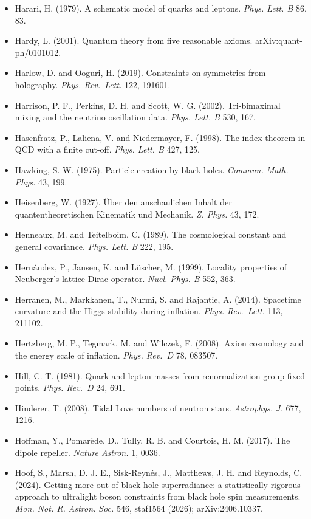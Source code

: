 \documentclass[
  11pt,
]{article}
\begin{document}
\begin{itemize}
\item
  Harari, H. (1979). A schematic model of quarks and leptons. \emph{Phys. Lett. B} 86, 83.
\item
  Hardy, L. (2001). Quantum theory from five reasonable axioms. arXiv:quant-ph/0101012.
\item
  Harlow, D. and Ooguri, H. (2019). Constraints on symmetries from holography. \emph{Phys. Rev.~Lett.} 122, 191601.
\item
  Harrison, P. F., Perkins, D. H. and Scott, W. G. (2002). Tri-bimaximal mixing and the neutrino oscillation data. \emph{Phys. Lett. B} 530, 167.
\item
  Hasenfratz, P., Laliena, V. and Niedermayer, F. (1998). The index theorem in QCD with a finite cut-off. \emph{Phys. Lett. B} 427, 125.
\item
  Hawking, S. W. (1975). Particle creation by black holes. \emph{Commun. Math. Phys.} 43, 199.
\item
  Heisenberg, W. (1927). Über den anschaulichen Inhalt der quantentheoretischen Kinematik und Mechanik. \emph{Z. Phys.} 43, 172.
\item
  Henneaux, M. and Teitelboim, C. (1989). The cosmological constant and general covariance. \emph{Phys. Lett. B} 222, 195.
\item
  Hernández, P., Jansen, K. and Lüscher, M. (1999). Locality properties of Neuberger's lattice Dirac operator. \emph{Nucl. Phys. B} 552, 363.
\item
  Herranen, M., Markkanen, T., Nurmi, S. and Rajantie, A. (2014). Spacetime curvature and the Higgs stability during inflation. \emph{Phys. Rev.~Lett.} 113, 211102.
\item
  Hertzberg, M. P., Tegmark, M. and Wilczek, F. (2008). Axion cosmology and the energy scale of inflation. \emph{Phys. Rev.~D} 78, 083507.
\item
  Hill, C. T. (1981). Quark and lepton masses from renormalization-group fixed points. \emph{Phys. Rev.~D} 24, 691.
\item
  Hinderer, T. (2008). Tidal Love numbers of neutron stars. \emph{Astrophys. J.} 677, 1216.
\item
  Hoffman, Y., Pomarède, D., Tully, R. B. and Courtois, H. M. (2017). The dipole repeller. \emph{Nature Astron.} 1, 0036.
\item
  Hoof, S., Marsh, D. J. E., Sisk-Reynés, J., Matthews, J. H. and Reynolds, C. (2024). Getting more out of black hole superradiance: a statistically rigorous approach to ultralight boson constraints from black hole spin measurements. \emph{Mon. Not. R. Astron. Soc.} 546, staf1564 (2026); arXiv:2406.10337.

\end{itemize}
\end{document}
